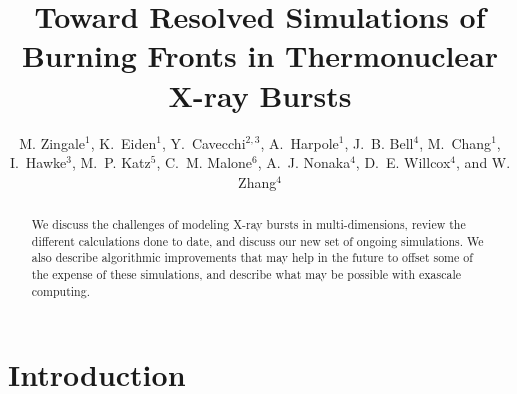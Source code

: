 \documentclass[a4paper]{jpconf}
\begin{document}
\title{Toward Resolved Simulations of Burning Fronts in Thermonuclear
       X-ray Bursts}

\author{M. Zingale$^1$,
        K.~Eiden$^1$,
        Y.~Cavecchi$^{2,3}$,
        A.~Harpole$^1$,
        J.~B. Bell$^4$,
        M.~Chang$^1$,
        I.~Hawke$^3$,
        M.~P. Katz$^5$,
        C.~M. Malone$^6$,
        A.~J. Nonaka$^4$,
        D.~E. Willcox$^4$, and
        W. Zhang$^4$}

\address{$^1$Department of Physics and Astronomy, Stony Brook
  University, Stony Brook, NY 11794-3800 USA}

\address{$^2$Department of Astrophysical Sciences, Princeton University,
  Peyton Hall, Princeton, NJ 08544, USA}

\address{$^3$Mathematical Sciences and STAG Research Centre,
  University of Southampton, SO17 1BJ, UK}

\address{$^4$Center for Computational Sciences and Engineering,
  Lawrence Berkeley National Lab, Berkeley, CA 94720 USA}

\address{$^5$NVIDIA Corporation, 2788 San Tomas Expressway,
  Santa Clara, CA, 95050 USA}

\address{$^6$Los Alamos National Laboratory, Los Alamos, NM, 87545 USA}


\begin{abstract}
We discuss the challenges of modeling X-ray bursts in
multi-dimensions, review the different calculations done to date, and
discuss our new set of ongoing simulations.  We also describe
algorithmic improvements that may help in the future to offset some of
the expense of these simulations, and describe what may be possible
with exascale computing.
\end{abstract}



\section{Introduction}
\end{document}
